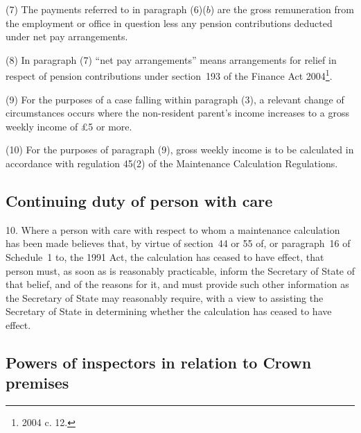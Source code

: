 \documentclass[12pt,a4paper]{article}
\begin{document}
(7) The payments referred to in paragraph (6)($b$)  are the gross remuneration from the employment or office in question less any pension contributions deducted under net pay arrangements.

(8) In paragraph (7) “net pay arrangements” means arrangements for relief in respect of pension contributions under section~193 of the Finance Act 2004\footnote{2004 c. 12.}.

(9) For the purposes of a case falling within paragraph (3), a relevant change of circumstances occurs where the non-resident parent’s income increases to a gross weekly income of £5 or more.

(10) For the purposes of paragraph (9), gross weekly income is to be calculated in accordance with regulation 45(2) of the Maintenance Calculation Regulations.


\subsection[10. Continuing duty of person with care]{Continuing duty of person with care}

10.  Where a person with care with respect to whom a maintenance calculation has been made believes that, by virtue of section~44 or 55 of, or paragraph~16 of Schedule~1 to, the 1991 Act, the calculation has ceased to have effect, that person must, as soon as is reasonably practicable, inform the 
Secretary of State  %
of that belief, and of the reasons for it, and must provide such other information as the 
Secretary of State  %
may reasonably require, with a view to assisting the 
Secretary of State  %
in determining whether the calculation has ceased to have effect.


\subsection[11. Powers of inspectors in relation to Crown premises]{Powers of inspectors in relation to Crown premises}
\end{document}
